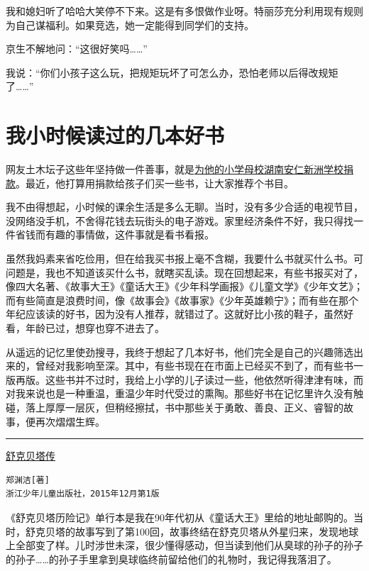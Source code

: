 \documentclass[twoside,openright,headings=optiontohead]{ctexbook} %
\begin{document}
{我和媳妇听了哈哈大笑停不下来。这是有多恨做作业呀。特丽莎充分利用现有规则为自己谋福利。如果竞选，她一定能得到同学们的支持。

京生不解地问：``这很好笑吗\ldots{}\ldots{}''

我说：``你们小孩子这么玩，把规矩玩坏了可怎么办，恐怕老师以后得改规矩了\ldots{}\ldots{}''

\chapter*{我小时候读过的几本好书}\label{kids-books}

网友土木坛子这些年坚持做一件善事，就是\href{https://tumutanzi.com/archives/15430}{为他的小学母校湖南安仁新洲学校捐款}。最近，他打算用捐款给孩子们买一些书，让大家推荐个书目。

我不由得想起，小时候的课余生活是多么无聊。当时，没有多少合适的电视节目，没网络没手机，不舍得花钱去玩街头的电子游戏。家里经济条件不好，我只得找一件省钱而有趣的事情做，这件事就是看书看报。

虽然我妈素来省吃俭用，但在给我买书报上毫不含糊，我要什么书就买什么书。可问题是，我也不知道该买什么书，就瞎买乱读。现在回想起来，有些书报买对了，像四大名著、《故事大王》《童话大王》《少年科学画报》《儿童文学》《少年文艺》；而有些简直是浪费时间，像《故事会》《故事家》《少年英雄赖宁》；而有些在那个年纪应该读的好书，因为没有人推荐，就错过了。这就好比小孩的鞋子，虽然好看，年龄已过，想穿也穿不进去了。

从遥远的记忆里使劲搜寻，我终于想起了几本好书，他们完全是自己的兴趣筛选出来的，曾经对我影响至深。其中，有些书现在在市面上已经买不到了，而有些书一版再版。这些书并不过时，我给上小学的儿子读过一些，他依然听得津津有味，而对我来说也是一种重温，重温少年时代受过的熏陶。那些好书在记忆里许久没有触碰，落上厚厚一层灰，但稍经擦拭，书中那些关于勇敢、善良、正义、睿智的故事，便再次熠熠生辉。

\begin{center}\rule{0.5\linewidth}{\linethickness}\end{center}

\href{https://www.amazon.cn/gp/product/B018TW5FHS/ref=ox_sc_act_title_6?ie=UTF8\&psc=1\&smid=A1AJ19PSB66TGU}{舒克贝塔传}

\begin{verbatim}
郑渊洁[著]
浙江少年儿童出版社，2015年12月第1版
\end{verbatim}

《舒克贝塔历险记》单行本是我在90年代初从《童话大王》里给的地址邮购的。当时，舒克贝塔的故事写到了第100回，故事终结在舒克贝塔从外星归来，发现地球上全部变了样。儿时涉世未深，很少懂得感动，但当读到他们从臭球的孙子的孙子的孙子\ldots{}\ldots{}的孙子手里拿到臭球临终前留给他们的礼物时，我记得我落泪了。

}
\end{document}
